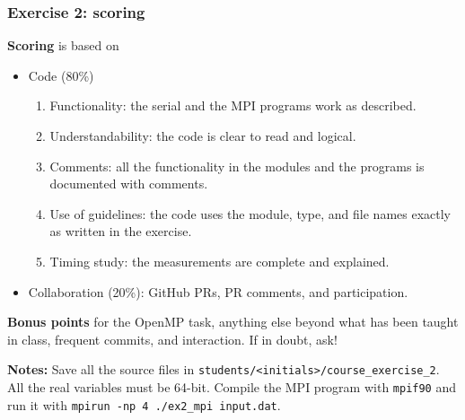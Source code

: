 \begin{frame}
  \frametitle{Exercise 2: scoring}
  \textbf{Scoring} is based on
  \begin{itemize}
    \item Code (80\%)
      \begin{enumerate}
        \item Functionality: the serial and the MPI programs work as described.
        \item Understandability: the code is clear to read and logical.
        \item Comments: all the functionality in the modules and the programs is documented with comments.
        \item Use of guidelines: the code uses the module, type, and file names exactly as written in the exercise.
        \item Timing study: the measurements are complete and explained.
      \end{enumerate}
    \item Collaboration (20\%): GitHub PRs, PR comments, and participation.
  \end{itemize}

  \textbf{Bonus points} for the OpenMP task, anything else beyond what has been taught in class, frequent commits, and interaction. If in doubt, ask!

  \vspace*{2mm}
  \textbf{Notes:} Save all the source files in \texttt{students/<initials>/course\_exercise\_2}. All the real variables must be 64-bit. Compile the MPI program with \texttt{mpif90} and run it with \mbox{\texttt{mpirun -np 4 ./ex2\_mpi input.dat}}.
\end{frame}



